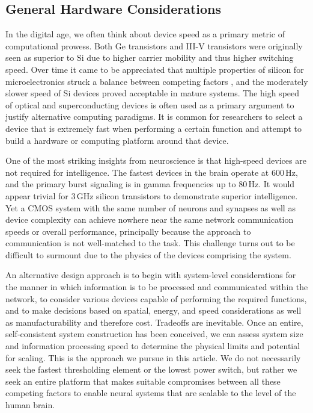\subsection{\label{sec:general_hardware_considerations}General Hardware Considerations}



\vspace{3em}
In the digital age, we often think about device speed as a primary metric of computational prowess. Both Ge transistors and III-V transistors were originally seen as superior to Si due to higher carrier mobility and thus higher switching speed. Over time it came to be appreciated that multiple properties of silicon for microelectronics struck a balance between competing factors \cite{heza2004}, and the moderately slower speed of Si devices proved acceptable in mature systems. The high speed of optical and superconducting devices is often used as a primary argument to justify alternative computing paradigms. It is common for researchers to select a device that is extremely fast when performing a certain function and attempt to build a hardware or computing platform around that device. 

One of the most striking insights from neuroscience is that high-speed devices are not required for intelligence. The fastest devices in the brain operate at 600\,Hz, and the primary burst signaling is in gamma frequencies up to 80\,Hz. It would appear trivial for 3\,GHz silicon transistors to demonstrate superior intelligence. Yet a CMOS system with the same number of neurons and synapses as well as device complexity can achieve nowhere near the same network communication speeds or overall performance, principally because the approach to communication is not well-matched to the task. This challenge turns out to be difficult to surmount due to the physics of the devices comprising the system.

An alternative design approach is to begin with system-level considerations for the manner in which information is to be processed and communicated within the network, to consider various devices capable of performing the required functions, and to make decisions based on spatial, energy, and speed considerations as well as manufacturability and therefore cost. Tradeoffs are inevitable. Once an entire, self-consistent system construction has been conceived, we can assess system size and information processing speed to determine the physical limits and potential for scaling. This is the approach we pursue in this article. We do not necessarily seek the fastest thresholding element or the lowest power switch, but rather we seek an entire platform that makes suitable compromises between all these competing factors to enable neural systems that are scalable to the level of the human brain.

